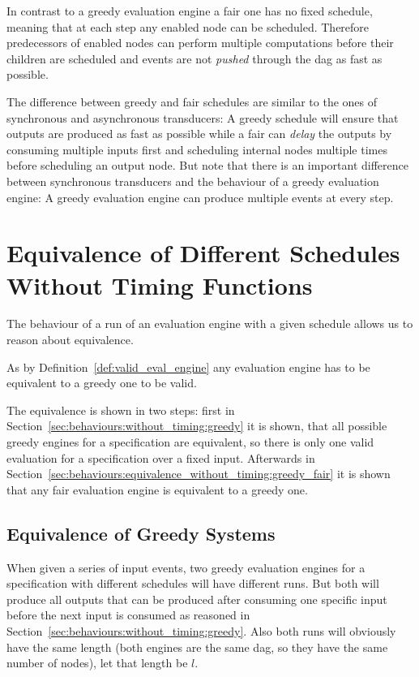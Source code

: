 In contrast to a greedy evaluation engine a fair one has no fixed schedule, meaning that at each step any enabled node can be scheduled.
Therefore predecessors of enabled nodes can perform multiple computations before their children are scheduled and events are not \emph{pushed} through the \gls{dag} as fast as possible.

The difference between greedy and fair schedules are similar to the ones of synchronous and asynchronous transducers: A greedy schedule will ensure that outputs are produced as fast as possible while a fair can \emph{delay} the outputs by consuming multiple inputs first and scheduling internal nodes multiple times before scheduling an output node.
But note that there is an important difference between synchronous transducers and the behaviour of a greedy evaluation engine: A greedy evaluation engine can produce multiple events at every step.

\section{Equivalence of Different Schedules Without Timing Functions}
\label{sec:behaviours:equivalence_without_timing}

The behaviour of a run of an evaluation engine with a given schedule allows us to reason about equivalence.

As by Definition~\ref{def:valid_eval_engine} any evaluation engine has to be equivalent to a greedy one to be valid.

The equivalence is shown in two steps: first in Section~\ref{sec:behaviours:without_timing:greedy} it is shown, that all possible greedy engines for a specification are equivalent, so there is only one valid evaluation for a specification over a fixed input.
Afterwards in Section~\ref{sec:behaviours:equivalence_without_timing:greedy_fair} it is shown that any fair evaluation engine is equivalent to a greedy one.


\subsection{Equivalence of Greedy Systems}
\label{sec:behaviours:equivalence_without_timing:greedy}

When given a series of input events, two greedy evaluation engines for a specification with different schedules will have different runs.
But both will produce all outputs that can be produced after consuming one specific input before the next input is consumed as reasoned in Section~\ref{sec:behaviours:without_timing:greedy}.
Also both runs will obviously have the same length (both engines are the same \gls{dag}, so they have the same number of nodes), let that length be \(l\).


